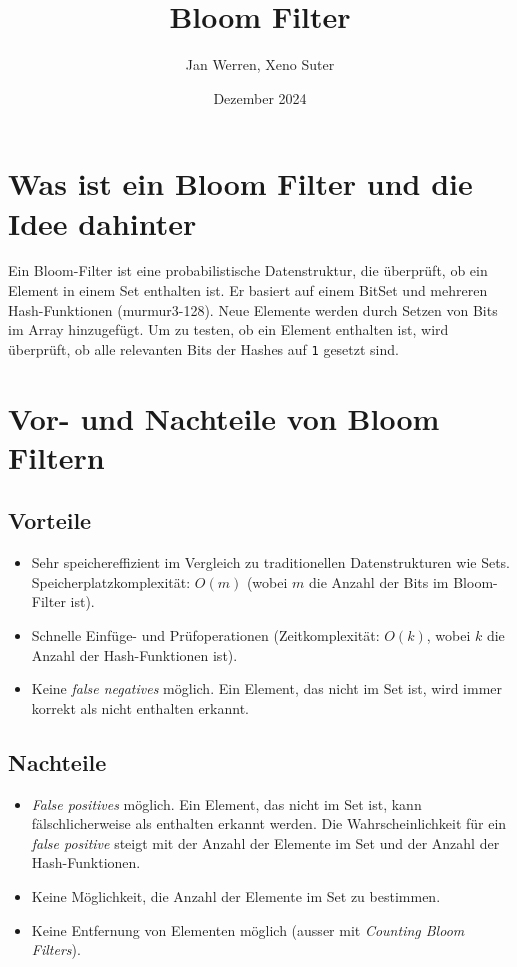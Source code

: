 \documentclass[a4paper, 12pt]{article}
\title{Bloom Filter}
\author{Jan Werren, Xeno Suter}
\date{Dezember 2024}
\begin{document}
\maketitle
\tableofcontents

\newpage

\section{Was ist ein Bloom Filter und die Idee dahinter}\label{sec:was-ist-ein-bloom-filter-und-die-idee-dahinter}
Ein Bloom-Filter ist eine probabilistische Datenstruktur, die überprüft, ob ein Element in einem Set enthalten ist.
Er basiert auf einem BitSet und mehreren Hash-Funktionen (murmur3-128). 
Neue Elemente werden durch Setzen von Bits im Array hinzugefügt.
Um zu testen, ob ein Element enthalten ist, wird überprüft, ob alle relevanten Bits der Hashes auf \texttt{1} gesetzt sind.

\section{Vor- und Nachteile von Bloom Filtern}\label{sec:vor--und-nachteile-von-bloom-filtern}

\subsection{Vorteile}\label{subsec:vorteile}
\begin{itemize}
    \item Sehr speichereffizient im Vergleich zu traditionellen Datenstrukturen wie Sets.
    Speicherplatzkomplexität: $O(m)$ (wobei $m$ die Anzahl der Bits im Bloom-Filter ist).
    \item Schnelle Einfüge- und Prüfoperationen (Zeitkomplexität: $O(k)$, wobei $k$ die Anzahl der Hash-Funktionen ist).
    \item Keine \textit{false negatives} möglich.
    Ein Element, das nicht im Set ist, wird immer korrekt als nicht enthalten erkannt.
\end{itemize}

\subsection{Nachteile}\label{subsec:nachteile}
\begin{itemize}
    \item \textit{False positives} möglich.
    Ein Element, das nicht im Set ist, kann fälschlicherweise als enthalten erkannt werden.
    Die Wahrscheinlichkeit für ein \textit{false positive} steigt mit der Anzahl der Elemente im Set und der Anzahl der Hash-Funktionen.
    \item Keine Möglichkeit, die Anzahl der Elemente im Set zu bestimmen.
    \item Keine Entfernung von Elementen möglich (ausser mit \textit{Counting Bloom Filters}).
\end{itemize}
\end{document}
